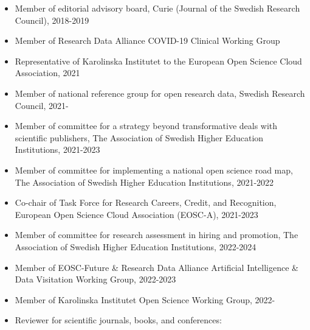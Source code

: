 \documentclass[10pt,a4paper,twocolumn]{article}
\begin{document}
\begin{itemize}
    \item Member of editorial advisory board, Curie (Journal of the Swedish Research Council), 2018-2019
    
    

    \item Member of Research Data Alliance COVID-19 Clinical Working Group
    
    

    \item Representative of Karolinska Institutet to the European Open Science Cloud Association, 2021
    
    

    \item Member of national reference group for open research data, Swedish Research Council, 2021-
    
    

    \item Member of committee for a strategy beyond transformative deals with scientific publishers, The Association of Swedish Higher Education Institutions, 2021-2023
    
    

    \item Member of committee for implementing a national open science road map, The Association of Swedish Higher Education Institutions, 2021-2022
    
    

    \item Co-chair of Task Force for Research Careers, Credit, and Recognition, European Open Science Cloud Association (EOSC-A), 2021-2023
    
    

    \item Member of committee for research assessment in hiring and promotion, The Association of Swedish Higher Education Institutions, 2022-2024
    
    

    \item Member of EOSC-Future \& Research Data Alliance Artificial Intelligence \& Data Visitation Working Group, 2022-2023
    
    

    \item Member of Karolinska Institutet Open Science Working Group, 2022-
    
    

    \item Reviewer for scientific journals, books, and conferences:
    

\end{itemize}
\end{document}
